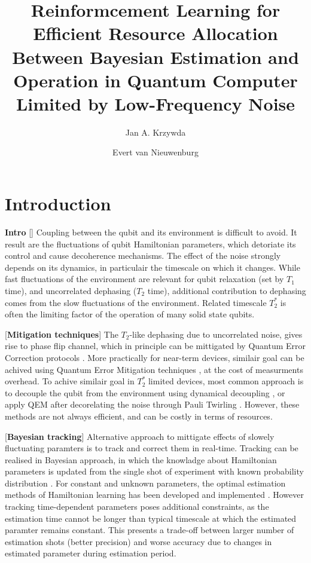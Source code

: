 \documentclass[aps,twocolumn,pra,notitlepage,]{revtex4-2}
\begin{document}
\author{Jan A. Krzywda}
\author{Evert van Nieuwenburg}

\title{Reinformcement Learning for Efficient Resource Allocation Between Bayesian Estimation and Operation in Quantum Computer Limited by Low-Frequency Noise} 


\begin{abstract}

\end{abstract}
\maketitle

\section{Introduction}
\textbf{Intro} 
[] Coupling between the qubit and its environment is difficult to avoid. It result are the fluctuations of qubit Hamiltonian parameters, which detoriate its control and cause decoherence mechanisms. The effect of the noise strongly depends on its dynamics, in particulair the timescale on which it changes. While fast fluctuations of the environment are relevant for qubit relaxation (set by $T_1$ time), and uncorrelated dephasing ($T_2$ time), additional contribution to dephasing comes from the slow fluctuations of the environment. Related timescale $T_2^*$ is often the limiting factor of the operation of many solid state qubits.

[\textbf{Mitigation techniques}] The $T_2$-like dephasing due to uncorrelated noise, gives rise to phase flip channel, which in principle can be mittigated by Quantum Error Correction protocols \cite{}. More practically for near-term devices, similair goal can be achived using Quantum Error Mitigation techniques \cite{}, at the cost of measurments overhead. To achive similair goal in $T_2^*$ limited devices, most common approach is to decouple the qubit from the environment using dynamical decoupling \cite{}, or apply QEM after decorelating the noise through Pauli Twirling \cite{}. However, these methods are not always efficient, and can be costly in terms of resources. 

[\textbf{Bayesian tracking}]
Alternative approach to mittigate effects of slowely fluctuating paramters is to track and correct them in real-time. Tracking can be realised in Bayesian approach, in which the knowladge about Hamiltonian parameters is updated from the single shot of experiment with known probability distribution \cite{}. For constant and unknown parameters, the optimal estimation methods of Hamiltonian learning has been developed \cite{} and implemented \cite{}. However tracking time-dependent parameters poses additional constraints, as the estimation time cannot be longer than typical timescale at which the estimated paramter remains constant. This presents a trade-off between larger number of estimation shots (better precision) and worse accuracy due to changes in estimated parameter during estimation period. 
\end{document}

